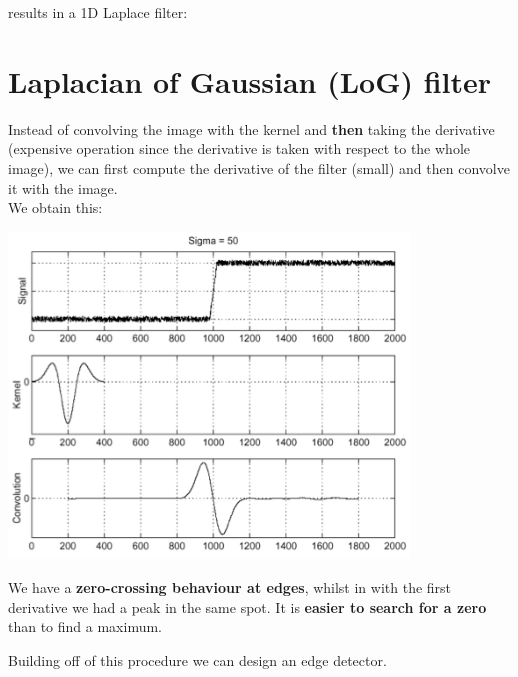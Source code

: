 \documentclass{article}
\begin{document}
results in a 1D Laplace filter:

\begin{center}
\end{center}

\newpage

\section*{Laplacian of Gaussian (LoG) filter}

Instead of convolving the image with the kernel and \textbf{then} taking the derivative (expensive operation since the derivative is taken with respect to the whole image), we can first compute the derivative of the filter (small) and then convolve it with the image. \\

We obtain this:
\begin{center}
\includegraphics[width=0.8\textwidth]{images/laplacian_derivative.png}
\end{center}

We have a \textbf{zero-crossing behaviour at edges}, whilst in with the first derivative we had a peak in the same spot. It is \textbf{easier to search for a zero} than to find a maximum.

Building off of this procedure we can design an edge detector.
\end{document}
